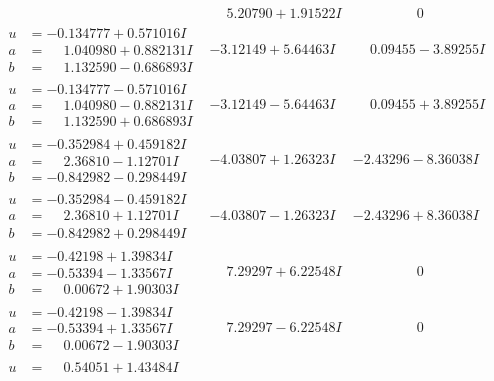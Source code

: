 \documentclass[1p]{elsarticle_modified}
\theoremstyle{definition}
\begin{document}
$$\begin{array}{c|c|c}
 & \phantom{-}5.20790 + 1.91522 I & \phantom{-0.000000 } 0 \\ \hline\begin{aligned}
u &= -0.134777 + 0.571016 I \\
a &= \phantom{-}1.040980 + 0.882131 I \\
b &= \phantom{-}1.132590 - 0.686893 I\end{aligned}
 & -3.12149 + 5.64463 I & \phantom{-}0.09455 - 3.89255 I \\ \hline\begin{aligned}
u &= -0.134777 - 0.571016 I \\
a &= \phantom{-}1.040980 - 0.882131 I \\
b &= \phantom{-}1.132590 + 0.686893 I\end{aligned}
 & -3.12149 - 5.64463 I & \phantom{-}0.09455 + 3.89255 I \\ \hline\begin{aligned}
u &= -0.352984 + 0.459182 I \\
a &= \phantom{-}2.36810 - 1.12701 I \\
b &= -0.842982 - 0.298449 I\end{aligned}
 & -4.03807 + 1.26323 I & -2.43296 - 8.36038 I \\ \hline\begin{aligned}
u &= -0.352984 - 0.459182 I \\
a &= \phantom{-}2.36810 + 1.12701 I \\
b &= -0.842982 + 0.298449 I\end{aligned}
 & -4.03807 - 1.26323 I & -2.43296 + 8.36038 I \\ \hline\begin{aligned}
u &= -0.42198 + 1.39834 I \\
a &= -0.53394 - 1.33567 I \\
b &= \phantom{-}0.00672 + 1.90303 I\end{aligned}
 & \phantom{-}7.29297 + 6.22548 I & \phantom{-0.000000 } 0 \\ \hline\begin{aligned}
u &= -0.42198 - 1.39834 I \\
a &= -0.53394 + 1.33567 I \\
b &= \phantom{-}0.00672 - 1.90303 I\end{aligned}
 & \phantom{-}7.29297 - 6.22548 I & \phantom{-0.000000 } 0 \\ \hline\begin{aligned}
u &= \phantom{-}0.54051 + 1.43484 I \\

\end{aligned}
\end{array}$$
\end{document}

